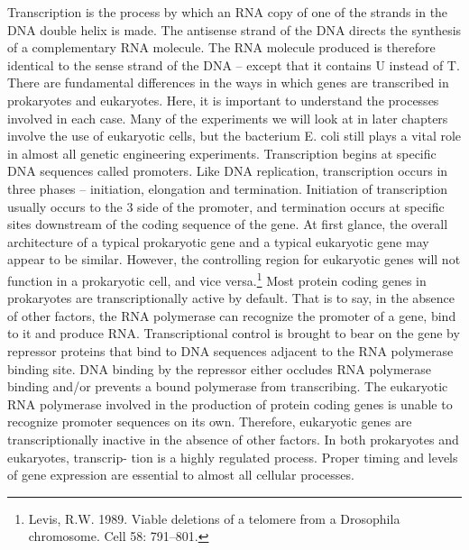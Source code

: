 Transcription is the process by which an RNA copy of one of the strands in
the DNA double helix is made. The antisense strand of the DNA directs the
synthesis of a complementary RNA molecule. The RNA molecule produced is
therefore identical to the sense strand of the DNA – except that it contains U
instead of T. There are fundamental differences in the ways in which genes are
transcribed in prokaryotes and eukaryotes. Here, it is important to understand
the processes involved in each case. Many of the experiments we will look at
in later chapters involve the use of eukaryotic cells, but the bacterium E. coli
still plays a vital role in almost all genetic engineering experiments.
Transcription begins at specific DNA sequences called promoters. Like DNA
replication, transcription occurs in three phases – initiation, elongation and
termination. Initiation of transcription usually occurs to the 3 side of the
promoter, and termination occurs at specific sites downstream of the coding
sequence of the gene. At first glance, the overall architecture of a typical
prokaryotic gene and a typical eukaryotic gene may appear to be similar. However, the controlling region for eukaryotic genes will not
function in a prokaryotic cell, and vice versa.\footnote{Levis, R.W. 1989. Viable deletions of a telomere from a Drosophila
chromosome. Cell 58: 791–801.}
Most protein coding genes in prokaryotes are transcriptionally active by
default. That is to say, in the absence of other factors, the RNA polymerase can
recognize the promoter of a gene, bind to it and produce RNA. Transcriptional
control is brought to bear on the gene by repressor proteins that bind to DNA
sequences adjacent to the RNA polymerase binding site. DNA binding by the
repressor either occludes RNA polymerase binding and/or prevents a bound
polymerase from transcribing. The eukaryotic RNA polymerase involved in the
production of protein coding genes is unable to recognize promoter
sequences on its own. Therefore, eukaryotic genes are transcriptionally inactive
in the absence of other factors. In both prokaryotes and eukaryotes, transcrip-
tion is a highly regulated process. Proper timing and levels of gene expression
are essential to almost all cellular processes.
